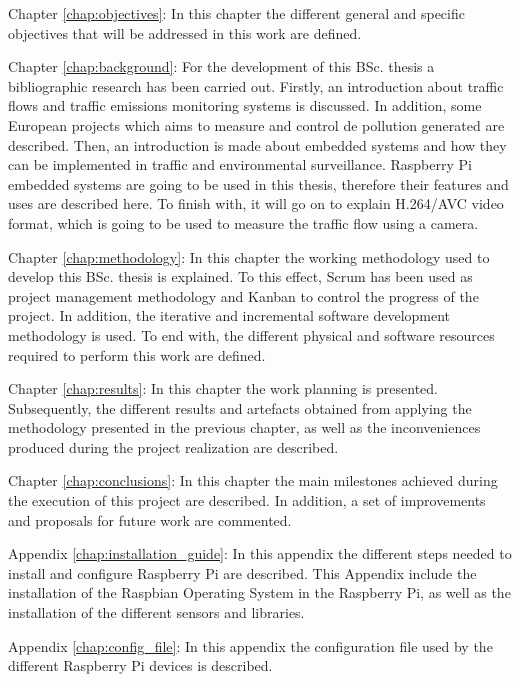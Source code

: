 \begin{definitionlist}
	\item[Chapter \ref{chap:objectives}: \nameref{chap:objectives}] In this chapter the different general and specific objectives that will be addressed in this work are defined.
	
	\item[Chapter \ref{chap:background}: \nameref{chap:background}] For the development of this \ac{BSc.} thesis a bibliographic research has been carried out. Firstly, an introduction about traffic flows and traffic emissions monitoring systems is discussed. In addition, some European projects which aims to measure and control de pollution generated are described. Then, an introduction is made about embedded systems and how they can be implemented in traffic and environmental surveillance. Raspberry Pi embedded systems are going to be used in this thesis, therefore their features and uses are described here. To finish with, it will go on to explain H.264/AVC video format, which is going to be used to measure the traffic flow using a camera.
	
	\item[Chapter \ref{chap:methodology}: \nameref{chap:methodology}] In this chapter the working methodology used to develop this \ac{BSc.} thesis is explained. To this effect, Scrum has been used as project management methodology and Kanban to control the progress of the project. In addition, the iterative and incremental software development methodology is used. To end with, the different physical and software resources required to perform this work are defined.
	
	\item[Chapter \ref{chap:results}: \nameref{chap:results}] In this chapter the work planning is presented. Subsequently, the different results and artefacts obtained from applying the methodology presented in the previous chapter, as well as the inconveniences produced during the project realization are described. 
	
	\item[Chapter \ref{chap:conclusions}: \nameref{chap:conclusions}] In this chapter the main milestones achieved during the execution of this project are described. In addition, a set of improvements and proposals for future work are commented. 
	
	\item[Appendix \ref{chap:installation_guide}: \nameref{chap:installation_guide}] In this appendix the different steps needed to install and configure Raspberry Pi are described. This Appendix include the installation of the Raspbian Operating System in the Raspberry Pi, as well as the installation of the different sensors and libraries.
	
	\item[Appendix \ref{chap:config_file}: \nameref{chap:config_file}] In this appendix the configuration file used by the different Raspberry Pi devices is described.
\end{definitionlist}



